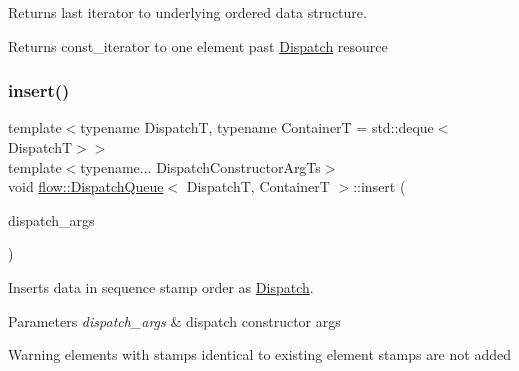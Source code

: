 Returns last iterator to underlying ordered data structure. 

\begin{DoxyReturn}{Returns}
{\ttfamily const\+\_\+iterator} to one element past \hyperlink{classflow_1_1_dispatch}{Dispatch} resource 
\end{DoxyReturn}
\mbox{\label{classflow_1_1_dispatch_queue_a5221c73d3790e6795c48229a2bcd7c0e}} 
\subsubsection{\texorpdfstring{insert()}{insert()}}
{\footnotesize\ttfamily template$<$typename DispatchT, typename ContainerT = std\+::deque$<$\+Dispatch\+T$>$$>$ \\
template$<$typename... Dispatch\+Constructor\+Arg\+Ts$>$ \\
void \hyperlink{classflow_1_1_dispatch_queue}{flow\+::\+Dispatch\+Queue}$<$ DispatchT, ContainerT $>$\+::insert (\begin{DoxyParamCaption}\item[{Dispatch\+Constructor\+Arg\+Ts \&\&...}]{dispatch\+\_\+args }\end{DoxyParamCaption})\hspace{0.3cm}{\ttfamily [inline]}}



Inserts data in sequence stamp order as \hyperlink{classflow_1_1_dispatch}{Dispatch}. 


\begin{DoxyParams}{Parameters}
{\em dispatch\+\_\+args} & dispatch constructor args\\
\hline
\end{DoxyParams}
\begin{DoxyWarning}{Warning}
elements with stamps identical to existing element stamps are not added 
\end{DoxyWarning}
\mbox{\label{classflow_1_1_dispatch_queue_a5ced281bc5c221a79bf88a6169429252}} 
